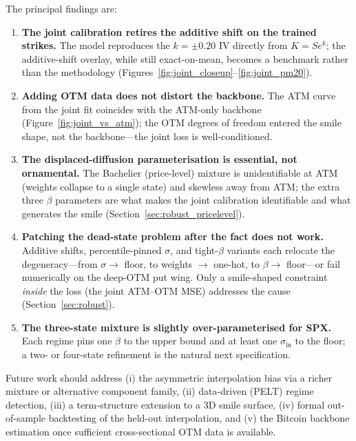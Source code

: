 \documentclass[12pt]{article}
\begin{document}
The principal findings are:
\begin{enumerate}
  \item \textbf{The joint calibration retires the additive shift on the trained strikes.} The model reproduces the $k=\pm 0.20$ IV directly from $K = S e^{k}$; the additive-shift overlay, while still exact-on-mean, becomes a benchmark rather than the methodology (Figures~\ref{fig:joint_closeup}--\ref{fig:joint_pm20}).
  \item \textbf{Adding OTM data does not distort the backbone.} The ATM curve from the joint fit coincides with the ATM-only backbone (Figure~\ref{fig:joint_vs_atm}); the OTM degrees of freedom entered the smile shape, not the backbone---the joint loss is well-conditioned.
  \item \textbf{The displaced-diffusion parameterisation is essential, not ornamental.} The Bachelier (price-level) mixture is unidentifiable at ATM (weights collapse to a single state) and skewless away from ATM; the extra three $\beta$ parameters are what makes the joint calibration identifiable and what generates the smile (Section~\ref{sec:robust_pricelevel}).
  \item \textbf{Patching the dead-state problem after the fact does not work.} Additive shifts, percentile-pinned $\sigma$, and tight-$\beta$ variants each relocate the degeneracy---from $\sigma \to$ floor, to weights $\to$ one-hot, to $\beta \to$ floor---or fail numerically on the deep-OTM put wing. Only a smile-shaped constraint \emph{inside} the loss (the joint ATM--OTM MSE) addresses the cause (Section~\ref{sec:robust}).
  \item \textbf{The three-state mixture is slightly over-parameterised for SPX.} Each regime pins one $\beta$ to the upper bound and at least one $\sigma_{\ln}$ to the floor; a two- or four-state refinement is the natural next specification.
\end{enumerate}

Future work should address (i) the asymmetric interpolation bias via a richer mixture or alternative component family, (ii) data-driven (PELT) regime detection, (iii) a term-structure extension to a 3D smile surface, (iv) formal out-of-sample backtesting of the held-out interpolation, and (v) the Bitcoin backbone estimation once sufficient cross-sectional OTM data is available.


\clearpage

\singlespacing 
\end{document}
